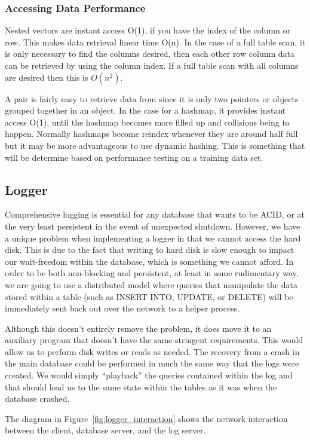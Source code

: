 \documentclass[letterpaper, 12pt]{article}
\begin{document}
\subsubsection{Accessing Data Performance}
	Nested vectors are instant access O(1), if you have the index of the column or row. This makes data retrieval
	linear time O(n). In the case of a full table scan, it is only necessary to find the columns desired, then each other row
	column data can be retrieved by using the column index. If a full table scan with all columns are desired then this is $O(n^2)$. 
	\par\vspace{\baselineskip}
	A pair is fairly easy to retrieve data from since it is only two pointers or objects grouped together in an object. In the case for a hashmap, it provides instant access O(1), until the hashmap becomes more filled up and collisions being to happen. Normally hashmaps become reindex whenever they are around half full but it may be more advantageous to use dynamic hashing. This is something that will be determine based on performance testing on a training data set.

\newpage


  \subsection{Logger}
  Comprehensive logging is essential for any database that wants to be ACID, or
  at the very least persistent in the event of unexpected shutdown. However, we
  have a unique problem when implementing a logger in that we cannot access the
  hard disk. This is due to the fact that writing to hard disk is slow enough to
  impact our wait-freedom within the database, which is something we cannot afford.
  In order to be both non-blocking and persistent, at least in some rudimentary way,
  we are going to use a distributed model where queries that manipulate the data
  stored within a table (such as INSERT INTO, UPDATE, or DELETE) will be immediately
  sent back out over the network to a helper process.
  \par\vspace{\baselineskip}
  Although this doesn't entirely remove the problem, it does move it to an auxiliary
  program that doesn't have the same stringent requirements. This would allow us to
  perform disk writes or reads as needed. The recovery from a crash in the main database
  could be performed in much the same way that the logs were created. We would simply
  ``playback'' the queries contained within the log and that should lead us to the same
  state within the tables as it was when the database crashed.
  \par\vspace{\baselineskip}
  The diagram in Figure~\ref{fig:logger_interaction} shows the network interaction between
  the client, database server, and the log server.
  
\end{document}
